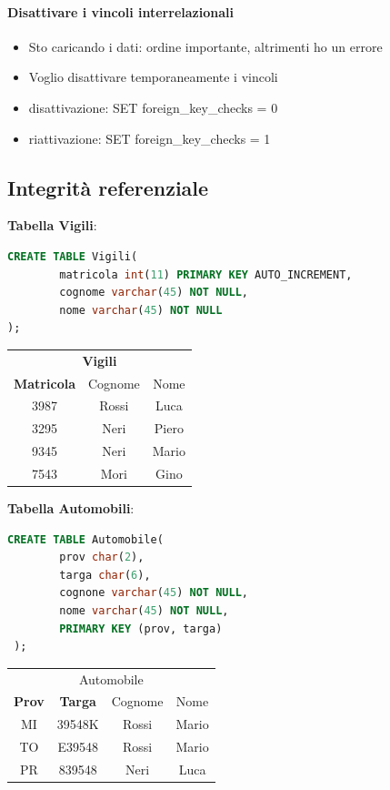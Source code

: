 \documentclass[12pt,a4paper]{article}
\begin{document}
\paragraph{Disattivare i vincoli interrelazionali}
\begin{itemize}
\item Sto caricando i dati: ordine importante, altrimenti ho un errore
\item Voglio disattivare temporaneamente i vincoli
\item disattivazione: SET foreign\_key\_checks = 0
\item riattivazione: SET foreign\_key\_checks = 1
\end{itemize}

\subsection{Integrità referenziale}
\flushleft
\textbf{Tabella Vigili}:
\begin{lstlisting}[language = SQL]
CREATE TABLE Vigili(
        matricola int(11) PRIMARY KEY AUTO_INCREMENT,
        cognome varchar(45) NOT NULL,
        nome varchar(45) NOT NULL
);
\end{lstlisting}
\begin{center}
\begin{tabular}{ccc}
\multicolumn{3}{c}{\textbf{Vigili}} \\ 
\textbf{Matricola} & Cognome & Nome \\ \hline
3987 & Rossi & Luca \\
3295 & Neri & Piero \\
9345 & Neri & Mario \\
7543 & Mori & Gino \\ \hline
\end{tabular}\end{center}
\flushleft
\textbf{Tabella Automobili}:
\begin{lstlisting}[language = SQL]
CREATE TABLE Automobile(
        prov char(2),
        targa char(6),
        cognone varchar(45) NOT NULL,
        nome varchar(45) NOT NULL,
        PRIMARY KEY (prov, targa)
 );
\end{lstlisting}
\begin{center}
\begin{tabular}{cccc}
\multicolumn{4}{c}{Automobile} \\
\textbf{Prov} & \textbf{Targa} & Cognome & Nome \\ \hline
MI & 39548K & Rossi & Mario \\
TO & E39548 & Rossi & Mario \\
PR & 839548 & Neri & Luca\\ \hline
\end{tabular}\end{center}
\end{document}
